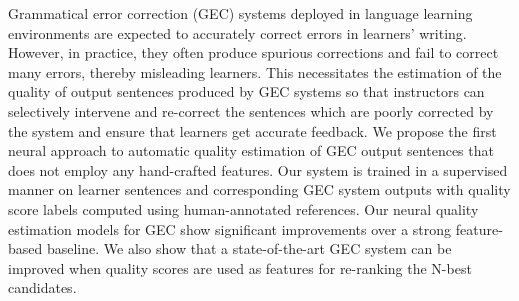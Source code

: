 Grammatical error correction (GEC) systems deployed in language learning environments are expected to accurately correct errors in learners' writing. However, in practice, they often produce spurious corrections and fail to correct many errors, thereby misleading learners. This necessitates the estimation of the quality of output sentences produced by GEC systems so that instructors can selectively intervene and re-correct the sentences which are poorly corrected by the system and ensure that learners get accurate feedback. We propose the first neural approach to automatic quality estimation of GEC output sentences that does not employ any hand-crafted features. Our system is trained in a supervised manner on learner sentences and corresponding GEC system outputs with quality score labels computed using human-annotated references. Our neural quality estimation models for GEC show significant improvements over a strong feature-based baseline. We also show that a state-of-the-art GEC system can be improved when quality scores are used as features for re-ranking the N-best candidates.
